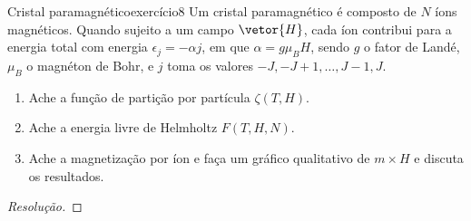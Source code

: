 \begin{exercício}{Cristal paramagnético}{exercício8}
    Um cristal paramagnético é composto de \(N\) íons magnéticos. Quando sujeito a um campo \(\vetor{H}\), cada íon contribui para a energia total com energia \(\epsilon_j = -\alpha j\), em que \(\alpha = g \mu_B H\), sendo \(g\) o fator de Landé, \(\mu_B\) o magnéton de Bohr, e \(j\) toma os valores \(-J, -J + 1, \dots, J-1, J\).
    \begin{enumerate}[label=(\alph*)]
        \item Ache a função de partição por partícula \(\zeta(T, H)\).
        \item Ache a energia livre de Helmholtz \(F(T, H, N)\).
        \item Ache a magnetização por íon e faça um gráfico qualitativo de \(m \times H\) e discuta os resultados.
    \end{enumerate}
\end{exercício}
\begin{proof}[Resolução]

\end{proof}
